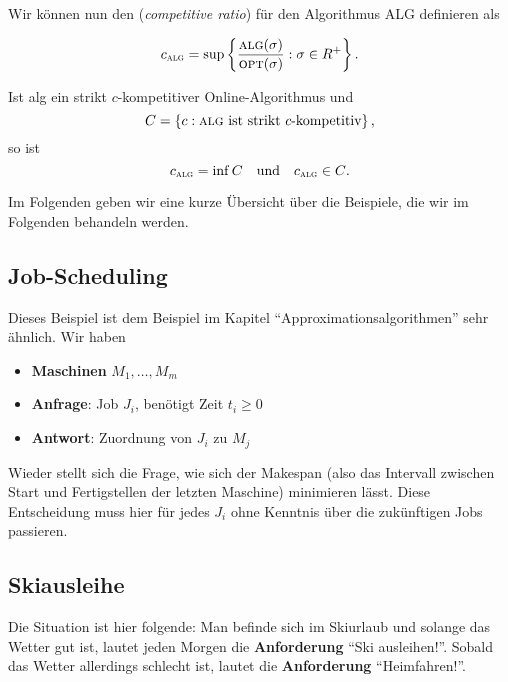 Wir können nun den  (\emph{competitive ratio}) für den Algorithmus ALG definieren als

\begin{equation*}
  c_{\textsc{alg}} = \sup\left \{ \frac{\textsc{alg}(\sigma)}{\textsc{opt}(\sigma)} : \sigma \in R^+ \right \}\text{.}
\end{equation*}

Ist alg ein strikt \( c \)-kompetitiver Online-Algorithmus und
\begin{equation*}
  C = \left \{ c : \text{\textsc{alg} ist strikt \( c \)-kompetitiv} \right \}\text{,}
\end{equation*}
so ist
\begin{equation*}
  c_\textsc{alg} = \inf C \quad \text{und} \quad c_\textsc{alg} \in C\text{.}
\end{equation*}

Im Folgenden geben wir eine kurze Übersicht über die Beispiele, die wir im Folgenden behandeln werden.

\subsection{Job-Scheduling}

Dieses Beispiel ist dem Beispiel im Kapitel ``Approximationsalgorithmen'' sehr ähnlich. Wir haben
\begin{itemize}
  \item \textbf{Maschinen} \( M_1,\dots,M_m \)
  \item \textbf{Anfrage}: Job \( J_i \), benötigt Zeit \( t_i \geq 0 \)
  \item \textbf{Antwort}: Zuordnung von \( J_i \) zu \( M_j \)
\end{itemize}

Wieder stellt sich die Frage, wie sich der Makespan (also das Intervall zwischen Start und Fertigstellen der letzten Maschine) minimieren lässt. Diese Entscheidung muss hier für jedes \( J_i \) ohne Kenntnis über die zukünftigen Jobs passieren.

\subsection{Skiausleihe}

Die Situation ist hier folgende: Man befinde sich im Skiurlaub und solange das Wetter gut ist, lautet jeden Morgen die \textbf{Anforderung} ``Ski ausleihen!''. Sobald das Wetter allerdings schlecht ist, lautet die \textbf{Anforderung} ``Heimfahren!''.

